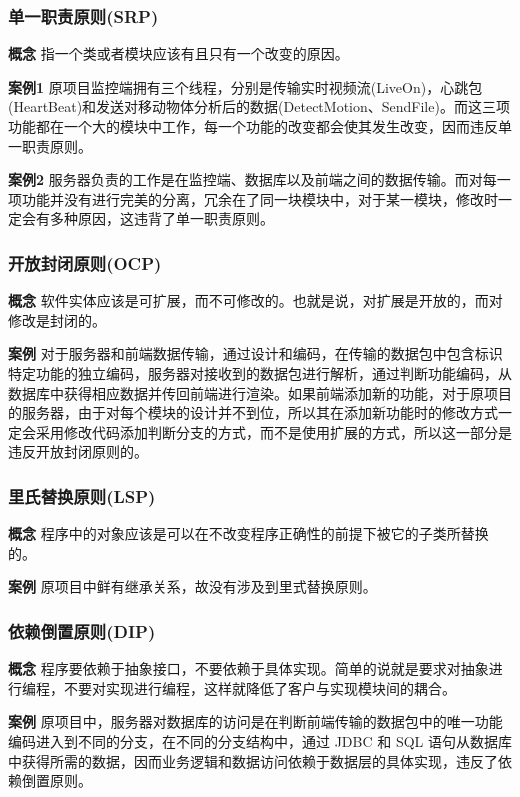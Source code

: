 \documentclass[article]{BJTU-thesis}
\begin{document}
\subsubsection{单一职责原则(SRP)}

\textbf{概念} 指一个类或者模块应该有且只有一个改变的原因。

\textbf{案例1}  原项目监控端拥有三个线程，分别是传输实时视频流(LiveOn)，心跳包(HeartBeat)和发送对移动物体分析后的数据(DetectMotion、SendFile)。而这三项功能都在一个大的模块中工作，每一个功能的改变都会使其发生改变，因而违反单一职责原则。

\textbf{案例2} 服务器负责的工作是在监控端、数据库以及前端之间的数据传输。而对每一项功能并没有进行完美的分离，冗余在了同一块模块中，对于某一模块，修改时一定会有多种原因，这违背了单一职责原则。

\subsubsection{开放封闭原则(OCP)}
\textbf{概念} 软件实体应该是可扩展，而不可修改的。也就是说，对扩展是开放的，而对修改是封闭的。

\textbf{案例} 对于服务器和前端数据传输，通过设计和编码，在传输的数据包中包含标识特定功能的独立编码，服务器对接收到的数据包进行解析，通过判断功能编码，从数据库中获得相应数据并传回前端进行渲染。如果前端添加新的功能，对于原项目的服务器，由于对每个模块的设计并不到位，所以其在添加新功能时的修改方式一定会采用修改代码添加判断分支的方式，而不是使用扩展的方式，所以这一部分是违反开放封闭原则的。

\subsubsection{里氏替换原则(LSP)}
\textbf{概念} 程序中的对象应该是可以在不改变程序正确性的前提下被它的子类所替换的。

\textbf{案例} 原项目中鲜有继承关系，故没有涉及到里式替换原则。

\subsubsection{依赖倒置原则(DIP)}
\textbf{概念} 程序要依赖于抽象接口，不要依赖于具体实现。简单的说就是要求对抽象进行编程，不要对实现进行编程，这样就降低了客户与实现模块间的耦合。

\textbf{案例} 原项目中，服务器对数据库的访问是在判断前端传输的数据包中的唯一功能编码进入到不同的分支，在不同的分支结构中，通过 JDBC 和 SQL 语句从数据库中获得所需的数据，因而业务逻辑和数据访问依赖于数据层的具体实现，违反了依赖倒置原则。\newline
\end{document}
